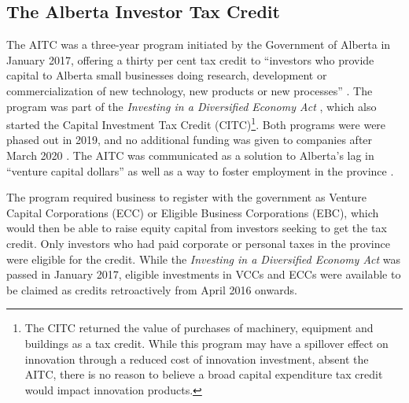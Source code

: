 \documentclass[../main.tex]{subfiles}
\begin{document}
\subsection{The Alberta Investor Tax Credit}

The AITC was a three-year program initiated by the Government of Alberta in January 2017, offering a thirty per cent tax credit to \enquote{investors who provide capital to Alberta small businesses doing research, development or commercialization of new technology, new products or new processes} \parencite[p.1]{albertaeconomicdevelopmentandtrade17}. The program was part of the \textit{Investing in a Diversified Economy Act} \nocite{albertajobseconomyandtrade16}, which also started the Capital Investment Tax Credit (CITC)\footnote{The CITC returned the value of purchases of machinery, equipment and buildings as a tax credit. While this program may have a spillover effect on innovation through a reduced cost of innovation investment, absent the AITC, there is no reason to believe a broad capital expenditure tax credit would impact innovation products.}. Both programs were were phased out in 2019, and no additional funding was given to companies after March 2020 \parencite{albertaeconomicdevelopmentandtrade19}. The AITC was communicated as a solution to Alberta's lag in \enquote{venture capital dollars} \parencite[p.1]{albertajobseconomyandtrade16} as well as a way to foster employment in the province \parencite{zabjeck16}.

The program required business to register with the government as Venture Capital Corporations (ECC) or Eligible Business Corporations (EBC), which would then be able to raise equity capital from investors seeking to get the tax credit. Only investors who had paid corporate or personal taxes in the province were eligible for the credit. While the \textit{Investing in a Diversified Economy Act} was passed in January 2017, eligible investments in VCCs and ECCs were available to be claimed as credits retroactively from April 2016 onwards. 
\end{document}
